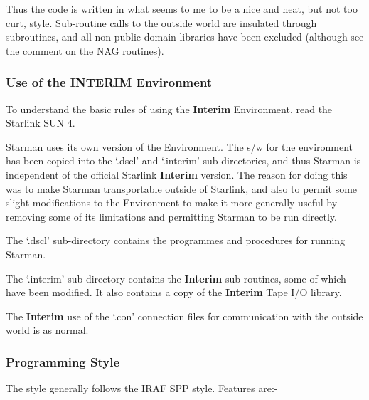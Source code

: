 Thus the code is written in what seems to me to be a nice and neat, but not
too curt, style. Sub-routine calls to the outside world are insulated
through subroutines, and all non-public domain libraries have been
excluded (although see the comment on the NAG routines).

\subsubsection{Use of the INTERIM Environment}

To understand the basic rules of using the {\bf Interim} Environment, read the
Starlink SUN 4.

Starman uses its own version of the Environment. The s/w for the 
environment has been copied into the `.dscl' and `.interim' 
sub-directories, and thus Starman is independent of the official Starlink
{\bf Interim} version. The reason for doing this was to make Starman 
transportable outside of  Starlink, and also to permit some slight
modifications to the Environment to make it more generally useful by 
removing some of its limitations and permitting Starman to be run
directly.

The `.dscl' sub-directory contains the programmes and procedures
for running Starman.

The `.interim' sub-directory contains the {\bf Interim} sub-routines,
some of which have been modified. It also contains a copy of the {\bf 
Interim} Tape I/O library.

The {\bf Interim} use of the `.con' connection files for communication with the 
outside world is as normal.

\subsubsection{Programming Style}

The style generally follows the IRAF SPP style. Features are:-

